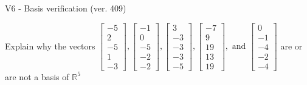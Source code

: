 \begin{exercise}
  \begin{exerciseTitle}V6 - Basis verification (ver. 409)\end{exerciseTitle}
  \begin{exerciseStatement}
    Explain why the vectors \(\left[\begin{array}{r}
-5 \\
2 \\
-5 \\
1 \\
-3
\end{array}\right] , \left[\begin{array}{r}
-1 \\
0 \\
-5 \\
-2 \\
-2
\end{array}\right] , \left[\begin{array}{r}
3 \\
-3 \\
-3 \\
-3 \\
-5
\end{array}\right] , \left[\begin{array}{r}
-7 \\
9 \\
19 \\
13 \\
19
\end{array}\right] , \text{ and } \left[\begin{array}{r}
0 \\
-1 \\
-4 \\
-2 \\
-4
\end{array}\right]\) are or are not a basis of \(\mathbb{R}^5\)	



\end{exerciseStatement}
\end{exercise}
